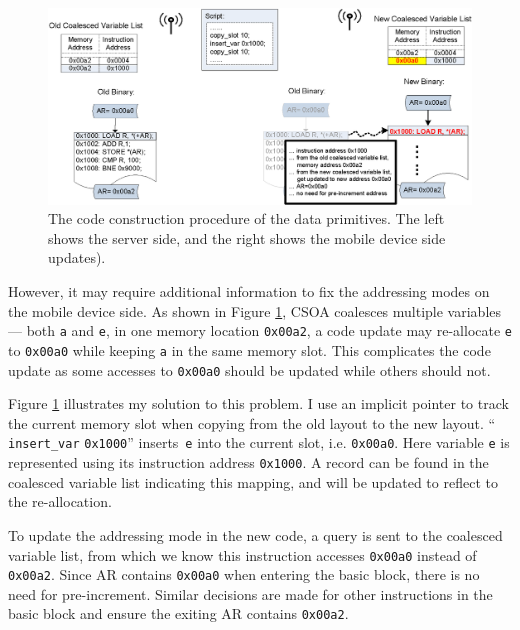 \begin{figure}[htbp]
\begin{center}
\includegraphics[width=6in]{./figures/correct.eps}
\caption[The code construction procedure of the data primitives.]{The code construction procedure of the data 
primitives.
The left shows the server side, and the right shows the mobile device side updates).}
\label{codecorrection}
\end{center}
\end{figure}

However, it may require additional information to fix the addressing modes on the mobile device side. As shown in 
Figure \ref{codecorrection}, CSOA coalesces multiple variables --- both {\tt a} and {\tt e}, in one memory location 
{\tt 0x00a2}, a code update may re-allocate {\tt e} to {\tt 0x00a0} while keeping {\tt a} in the same memory slot. This 
complicates the code update as some accesses to {\tt 0x00a0} should be updated while others should not.

Figure \ref{codecorrection} illustrates my solution to this problem. 
I use an implicit pointer to track the current memory slot when copying from the old layout to the new layout.  ``{\tt 
insert\_var} {\tt 0x1000}'' inserts~{\tt e} into the current slot, i.e. {\tt 0x00a0}. Here variable {\tt e} is 
represented using its instruction address {\tt 0x1000}. A record can be found in the coalesced variable list indicating 
this mapping, and will be updated to reflect to the re-allocation.

To update the addressing mode in the new code, a query is sent to the coalesced variable list, from which we know this 
instruction accesses {\tt 0x00a0} instead of {\tt 0x00a2}. Since AR contains {\tt 0x00a0} when entering the basic 
block, there is no need for pre-increment. Similar decisions are made for other instructions in the basic block and 
ensure the exiting AR contains {\tt 0x00a2}.


